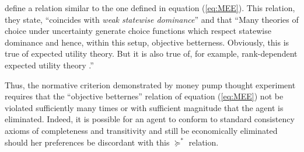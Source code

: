\documentclass[11pt,a4paper]{article}
\begin{document}
\textcite[141]{Cubitt2001} define a relation similar to the one defined in equation (\ref{eq:MEE}).
This relation, they state, \enquote{coincides with \textit{weak statewise dominance}} and that
\enquote{Many theories of choice under uncertainty generate choice functions which respect statewise dominance and hence, within this setup, objective betterness.
	Obviously, this is true of expected utility theory.
	But it is also true of, for example, \textcite{Quiggin1982} rank-dependent expected utility theory .}

Thus, the normative criterion demonstrated by money pump thought experiment requires that the \enquote{objective betternes} relation of equation (\ref{eq:MEE}) not be violated sufficiently many times or with sufficient magnitude that the agent is eliminated.
Indeed, it is possible for an agent to conform to standard consistency axioms of completeness and transitivity and still be economically eliminated should her preferences be discordant with this $\succcurlyeq^*$ relation.{\footnotemark}


\addtocounter{footnote}{-1}
\end{document}
